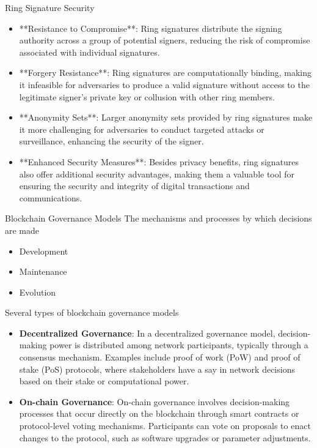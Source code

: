 \begin{withoutheadline}
\begin{frame}{Ring Signature Security}
    \begin{itemize}
        \item **Resistance to Compromise**: Ring signatures distribute the signing authority across a group of potential signers, reducing the risk of compromise associated with individual signatures.
        \item **Forgery Resistance**: Ring signatures are computationally binding, making it infeasible for adversaries to produce a valid signature without access to the legitimate signer's private key or collusion with other ring members.
        \item **Anonymity Sets**: Larger anonymity sets provided by ring signatures make it more challenging for adversaries to conduct targeted attacks or surveillance, enhancing the security of the signer.
        \item **Enhanced Security Measures**: Besides privacy benefits, ring signatures also offer additional security advantages, making them a valuable tool for ensuring the security and integrity of digital transactions and communications.
    \end{itemize}
\end{frame}


\begin{frame}{Blockchain Governance Models}
    The mechanisms and processes by which decisions are made
    \begin{itemize}
        \item Development
        \item Maintenance
        \item Evolution
    \end{itemize}

    Several types of blockchain governance models
    \begin{itemize}
        \item \textbf{Decentralized Governance}: In a decentralized governance model, decision-making power is distributed among network participants, typically through a consensus mechanism. Examples include proof of work (PoW) and proof of stake (PoS) protocols, where stakeholders have a say in network decisions based on their stake or computational power.

        \item \textbf{On-chain Governance}: On-chain governance involves decision-making processes that occur directly on the blockchain through smart contracts or protocol-level voting mechanisms. Participants can vote on proposals to enact changes to the protocol, such as software upgrades or parameter adjustments.


\end{itemize}
\end{frame}
\end{withoutheadline}
